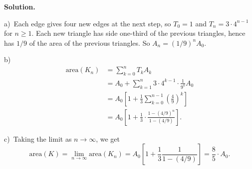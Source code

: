 \documentclass[12pt]{article}
\theoremstyle{definition}
\theoremstyle{remark}
\theoremstyle{definition}
\newenvironment{Solution}{\noindent\textbf{Solution.}}{}
\begin{document}
\begin{Solution}

a)\ Each edge gives four new edges at the next step, so $T_0=1$ and 
$T_n=3\cdot 4^{n-1}$ for $n\geq 1$. 
Each new triangle has side one-third of the previous triangles, hence has $1/9$ of the area of the previous triangles. So $A_n=(1/9)^{n}A_0$. 

b)\ 
\[\begin{split}
\text{area}(K_n)&=\sum_{k=0}^n T_k A_k\\
&=A_0+\sum_{k=1}^n 3\cdot 4^{k-1}\cdot \frac{1}{9^k}A_0\\
&=A_0\left [1+\frac{1}{3}\sum_{k=0}^{n-1}\left(\frac{4}{9}\right)^k\right]\\
&=A_0\left [1+\frac{1}{3}\cdot \frac{1-(4/9)^{n}}{1-(4/9)}\right].
\end{split}
\]

c)\ Taking the limit as $n\to\infty$, we get
\[\text{area}(K)=\lim_{n\to\infty}
\text{area}(K_n)=A_0\left [1+\frac{1}{3}\frac{1}{1-(4/9)}\right]
=\frac{8}{5}\cdot A_0.
\]

\end{Solution}
\end{document}
